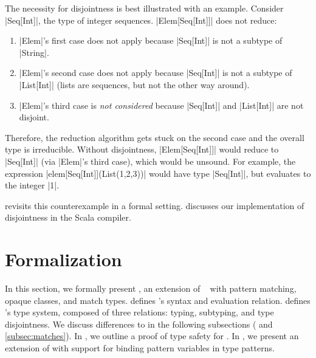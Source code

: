 The necessity for disjointness is best illustrated with an example. Consider |Seq[Int]|, the type of integer sequences. |Elem[Seq[Int]]| does not reduce:
\begin{enumerate}
  \item |Elem|'s first case does not apply because |Seq[Int]| is not a subtype of |String|.
  \item |Elem|'s second case does not apply because |Seq[Int]| is not a subtype of |List[Int]| (lists are sequences, but not the other way around).
  \item |Elem|'s third case is \emph{not considered} because |Seq[Int]| and |List[Int]| are not disjoint.
\end{enumerate}
Therefore, the reduction algorithm gets stuck on the second case and the overall type is irreducible.
Without disjointness, |Elem[Seq[Int]]| would reduce to |Seq[Int]| (via |Elem|'s third case), which would be unsound. For example, the expression |elem[Seq[Int]](List(1,2,3))| would have type |Seq[Int]|, but evaluates to the integer |1|.

 revisits this counterexample in a formal setting.  discusses our implementation of disjointness in the Scala compiler.



\section{Formalization}
\label{sec:formalization}

In this section, we formally present \SystemFm, an extension of \SystemFsub~\citep{cardelli1994an} with pattern matching, opaque classes, and match types.
 defines \Fm's syntax and evaluation relation.  defines \Fm's type system, composed of three relations: typing, subtyping, and type disjointness.
We discuss differences to \SystemFsub in the following subsections ( and \ref{subsec:matches}).
In , we outline a proof of type safety for \SystemFm.
In , we present an extension of \SystemFm with support for binding pattern variables in type patterns.

